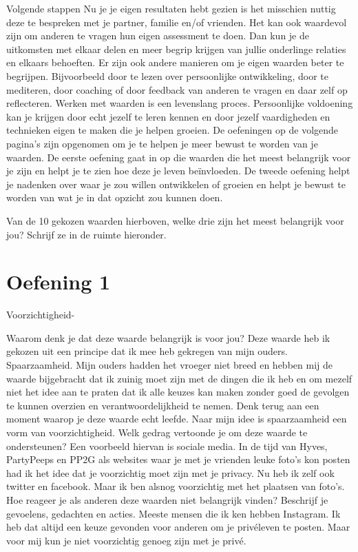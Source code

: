 \documentclass[11pt]{report}
\begin{document}
Volgende stappen Nu je je eigen resultaten hebt gezien is het misschien nuttig deze te bespreken met je partner, familie en/of vrienden. Het kan ook waardevol zijn om anderen te vragen hun eigen assessment te doen. Dan kun je de uitkomsten met elkaar delen en meer begrip krijgen van jullie onderlinge relaties en elkaars behoeften. Er zijn ook andere manieren om je eigen waarden beter te begrijpen. Bijvoorbeeld door te lezen over persoonlijke ontwikkeling, door te mediteren, door coaching of door feedback van anderen te vragen en daar zelf op reflecteren. Werken met waarden is een levenslang proces. Persoonlijke voldoening kan je krijgen door echt jezelf te leren kennen en door jezelf vaardigheden en technieken eigen te maken die je helpen groeien. De oefeningen op de volgende pagina's zijn opgenomen om je te helpen je meer bewust te worden van je waarden. De eerste oefening gaat in op die waarden die het meest belangrijk voor je zijn en helpt je te zien hoe deze je leven beïnvloeden. De tweede oefening helpt je nadenken over waar je zou willen ontwikkelen of groeien en helpt je bewust te worden van wat je in dat opzicht zou kunnen doen.

Van de 10 gekozen waarden hierboven, welke drie zijn het meest belangrijk voor jou? Schrijf ze in de ruimte hieronder.

\section{Oefening 1}


Voorzichtigheid- 

Waarom denk je dat deze waarde belangrijk is voor jou? Deze waarde heb ik gekozen uit een principe dat ik mee heb gekregen van mijn ouders. Spaarzaamheid. Mijn ouders hadden het vroeger niet breed en hebben mij de waarde bijgebracht dat ik zuinig moet zijn met de dingen die ik heb en om mezelf niet het idee aan te praten dat ik alle keuzes kan maken zonder goed de gevolgen te kunnen overzien en verantwoordelijkheid te nemen.
Denk terug aan een moment waarop je deze waarde echt leefde. Naar mijn idee is spaarzaamheid een vorm van voorzichtigheid. Welk gedrag vertoonde je om deze waarde te ondersteunen? Een voorbeeld hiervan is sociale media. In de tijd van Hyves, PartyPeeps en PP2G als websites waar je met je vrienden leuke foto’s kon posten had ik het idee dat je voorzichtig moet zijn met je privacy. Nu heb ik zelf ook twitter en facebook. Maar ik ben alsnog voorzichtig met het plaatsen van foto’s.
Hoe reageer je als anderen deze waarden niet belangrijk vinden? Beschrijf je gevoelens, gedachten en acties. Meeste mensen die ik ken hebben Instagram. Ik heb dat altijd een keuze gevonden voor anderen om je privéleven te posten. Maar voor mij kun je niet voorzichtig genoeg zijn met je privé.
\end{document}
